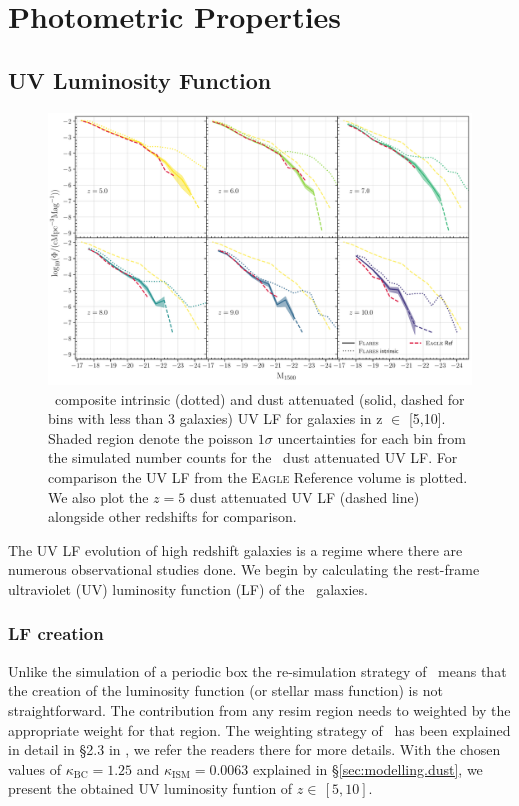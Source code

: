 \section{Photometric Properties}\label{sec:PhotProp}
\subsection{UV Luminosity Function}\label{sec:PhotProp.UVLF}
\begin{figure}
	\centering
	\includegraphics[width=\textwidth]{./figures/LF_FUV_z5_10_Flares-Eagle}
	\caption{\flares\, composite intrinsic (dotted) and dust attenuated (solid, dashed for bins with less than 3  galaxies) UV LF for  galaxies in z $\in$ [5,10]. Shaded region denote the poisson $1\sigma$ uncertainties for each bin from the simulated number counts for the \flares\, dust attenuated UV LF. For comparison the UV LF from the \textsc{Eagle} Reference volume is plotted. We also plot the $z=5$ dust attenuated UV LF (dashed line) alongside other redshifts for comparison. \label{fig: UVLF}} 
\end{figure}
The UV LF evolution of high redshift galaxies is a regime where there are numerous observational studies done. We begin by calculating the rest-frame ultraviolet (UV) luminosity function (LF) of the \flares\, galaxies. 

\subsubsection{LF creation}\label{sec: UVLF.LF_creat}
Unlike the simulation of a periodic box the re-simulation strategy of \flares\, means that the creation of the luminosity function (or stellar mass function) is not straightforward. The contribution from any resim region needs to weighted by the appropriate weight for that region. The weighting strategy of \flares\, has been explained in detail in \S 2.3 in , we refer the readers there for more details. With the chosen values of $\kappa_{\textrm{BC}}=1.25$ and $\kappa_{\textrm{ISM}}=0.0063$ explained in \S\ref{sec:modelling.dust}, we present the obtained UV luminosity funtion of $z\in\,[5,10]$. 

